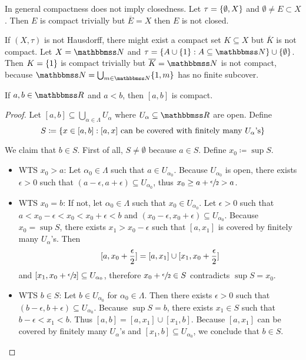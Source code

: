 \documentclass[screen,single]{techreport}
\numberwithin{equation}{section}
\begin{document}
\begin{example}\label{Exa:CompactNotImplyClosed}
	In general compactness does not imply closedness.
	Let $\tau = \{ {\emptyset,X} \}$ and $\emptyset \neq E \subset X$.
	Then $E$ is compact trivially but $\overline{E} = X$ then $E$ is not closed.
\end{example}

\begin{example}\label{Exa:ClosureOfCompactNotCompact}
	If $(X,\tau)$ is not Hausdorff, there might exist a compact set $K \subseteq X$ but $\overline{K}$ is not compact.
	Let $X = \bbN$ and $\tau = \set{ A \cup \set{1} : A \subseteq \bbN } \cup \set{\emptyset}$.
	Then $K = \{ {1} \}$ is compact trivially but $\overline{K} = \bbN$ is not compact, because  $\bbN = \bigcup_{m \in \bbN} \{1,m \}$ has no finite subcover.
\end{example}

\begin{proposition}\label{Prop:ClosedIntervalCompact}
	If $a,b \in \bbR$ and $a < b$, then $[a,b]$ is compact.
\end{proposition}
\begin{proof}
	Let $[a,b] \subseteq \bigcup_{\alpha \in \Lambda} U_\alpha$ where $U_\alpha \subseteq \bbR$ are open.
	Define
	\[
	S \coloneqq \{ { x \in [a,b] :  \text{$[a,x]$ can be covered with finitely many $U_\alpha$'s} } \}
	\]
	
	We claim that $b \in S$. First of all, $S \neq \emptyset$ because $a \in S$.
	Define $x_0 \coloneqq \sup S$.
	\begin{itemize}
		\item WTS $x_0 > a$: Let $\alpha_0 \in \Lambda$ such that $a \in U_{\alpha_0}$.
		Because $U_{\alpha_0}$ is open, there exists $\epsilon > 0$ such that $(a-\epsilon,a+\epsilon) \subseteq U_{\alpha_0}$, thus $x_0 \ge a + \sfrac{\epsilon}{2} > a$.
		
		\item WTS $x_0 = b$: If not, let $\alpha_0 \in \Lambda$ such that $x_0 \in U_{\alpha_0}$.
		Let $\epsilon > 0$ such that $a < x_0 - \epsilon < x_0 < x_0 + \epsilon < b$ and $(x_0-\epsilon,x_0+\epsilon) \subseteq U_{\alpha_0}$.
		Because $x_0 = \sup S$, there exists $x_1 > x_0 -\epsilon$ such that $[a,x_1]$ is covered by finitely many $U_\alpha$'s.
		Then
		\[
		[{a,x_0+\frac{\epsilon}{2}}] = [{a,x_1}] \cup [{x_1,x_0+\frac{\epsilon}{2}}]
		\]
		and $[x_1,x_0+\sfrac{\epsilon}{2}] \subseteq U_{\alpha_0}$, therefore $x_0 + \sfrac{\epsilon}{2} \in S$ contradicts $\sup S = x_0$.
		
		\item WTS $b \in S$: Let $b \in U_{\alpha_0}$ for $\alpha_0 \in \Lambda$.
		Then there exists $\epsilon > 0$ such that $(b-\epsilon,b+\epsilon) \subseteq U_{\alpha_0}$.
		Because $\sup S = b$, there exists $x_1 \in S$ such that $b-\epsilon < x_1 < b$.
		Thus $[a,b] = [a,x_1] \cup [x_1,b]$.
		Because $[a,x_1]$ can be covered by finitely many $U_\alpha$'s and $[x_1,b] \subseteq U_{\alpha_0}$, we conclude that $b \in S$.
	\end{itemize}
\end{proof}
\end{document}
